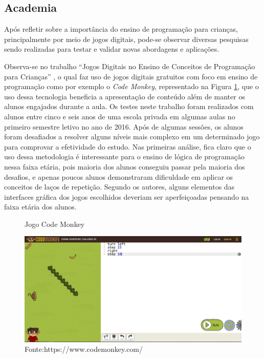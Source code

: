 \subsection{Academia}
Após refletir sobre a importância do ensino de programação para crianças, principalmente por meio de jogos digitais, pode-se observar diversas pesquisas sendo realizadas para testar e validar novas abordagens e aplicações. 

Observa-se no trabalho “Jogos Digitais no Ensino de Conceitos de Programação para Crianças” \cite{tadesco_2016}, o qual faz uso de jogos digitais gratuitos com foco em ensino de programação como por exemplo o \textit{Code Monkey}, representado na Figura \ref{figura:code_monkey}, que o uso dessa tecnologia beneficia a apresentação de conteúdo além de manter os alunos engajados durante a aula. Os testes neste trabalho foram realizados com alunos entre cinco e seis anos de uma escola privada em algumas aulas no primeiro semestre letivo no ano de 2016. Após de algumas sessões, os alunos foram desafiados a resolver alguns níveis mais complexo em um determinado jogo para comprovar a efetividade do estudo. Nas primeiras análise, fica claro que o uso dessa metodologia é  interessante para o ensino de lógica de programação nessa faixa etária, pois maioria dos alunos conseguiu passar pela maioria dos desafios, e apenas poucos alunos demonstraram dificuldade em aplicar os conceitos de laços de repetição. Segundo os autores, alguns elementos das interfaces gráfica dos jogos escolhidos deveriam ser aperfeiçoadas pensando na faixa etária dos alunos.

\begin{figure}[h!]
    \centering
    \caption{Jogo Code Monkey}
    \includegraphics[width=15cm]{images/cap2/code_monkey.png}
    \caption*{Fonte:https://www.codemonkey.com/}
    \label{figura:code_monkey}
\end{figure}

